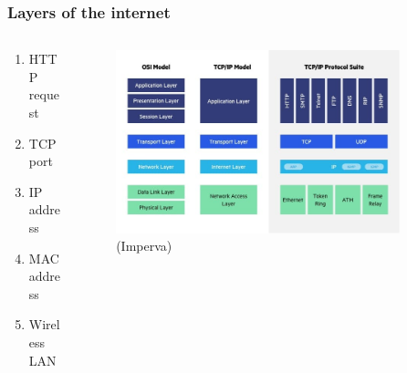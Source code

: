 \documentclass[compress, aspectratio=32]{beamer}
\begin{document}
\begin{frame}
    \frametitle{Layers of the internet}
    \begin{columns}
        \begin{column}[]{0.3\linewidth}
            \begin{enumerate}
                \item HTTP request
                \item TCP port
                \item IP address
                \item MAC address
                \item Wireless LAN
            \end{enumerate}
        \end{column}
        \begin{column}[]{0.7\linewidth}
            \begin{figure}
                \includegraphics[width=0.9\textwidth]{OSI-vs.-TCPIP-models.jpg}
                \caption*{(Imperva)}
            \end{figure}
        \end{column}
    \end{columns}
\end{frame}
\end{document}
